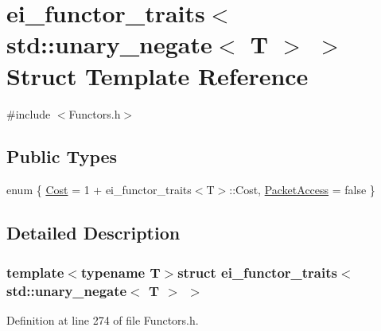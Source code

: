 \hypertarget{structei__functor__traits_3_01std_1_1unary__negate_3_01_t_01_4_01_4}{\section{ei\-\_\-functor\-\_\-traits$<$ std\-:\-:unary\-\_\-negate$<$ T $>$ $>$ Struct Template Reference}
\label{structei__functor__traits_3_01std_1_1unary__negate_3_01_t_01_4_01_4}
}


{\ttfamily \#include $<$Functors.\-h$>$}

\subsection*{Public Types}
\begin{DoxyCompactItemize}
\item 
enum \{ \hyperlink{structei__functor__traits_3_01std_1_1unary__negate_3_01_t_01_4_01_4_adacd3c330b0fa8b29a52258d868e0f40aba79ffd759508002cca5c2c54ce0fbf0}{Cost} = 1 + ei\-\_\-functor\-\_\-traits$<$T$>$\-:\-:Cost, 
\hyperlink{structei__functor__traits_3_01std_1_1unary__negate_3_01_t_01_4_01_4_adacd3c330b0fa8b29a52258d868e0f40a5d73330d545f3e58ec3840309b114e63}{Packet\-Access} = false
 \}
\end{DoxyCompactItemize}


\subsection{Detailed Description}
\subsubsection*{template$<$typename T$>$struct ei\-\_\-functor\-\_\-traits$<$ std\-::unary\-\_\-negate$<$ T $>$ $>$}



Definition at line 274 of file Functors.\-h.



